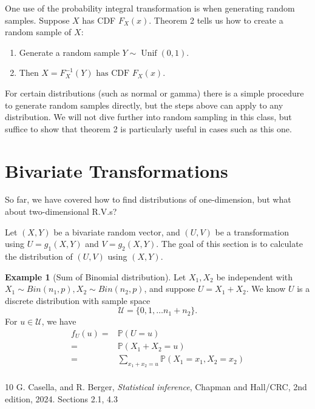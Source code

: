 \documentclass{article}
\theoremstyle{plain}
\theoremstyle{definition}
\newtheorem{exa}[thm]{Example}
\begin{document}
One use of the probability integral transformation is when generating random samples. Suppose $X$ has CDF $F_X(x)$. Theorem 2 tells us how to create a random sample of $X$:
\begin{enumerate}[label=(\arabic*)]
    \item Generate a random sample
$ Y \sim \operatorname{Unif}(0,1).$
\item Then $ X = F_X^{-1}(Y) \text{ has CDF } F_X(x).$
\end{enumerate}
For certain distributions (such as normal or gamma) there is a simple procedure to generate random samples directly, but the steps above can apply to any distribution. We will not dive further into random sampling in this class, but suffice to show that theorem 2 is particularly useful in cases such as this one. 

\section{Bivariate Transformations}

So far, we have covered how to find distributions of one-dimension, but what about two-dimensional R.V.s? 


Let $(X,Y)$ be a bivariate random vector, and $(U,V)$ be a transformation using $U = g_1(X,Y)$ and $V = g_2(X,Y).$ The goal of this section is to calculate the distribution of $(U,V)$ using $(X,Y)$.


\begin{exa}[Sum of Binomial distribution] \quad
    Let $X_1, X_2$ be independent with $X_1 \sim Bin(n_1,p), X_2 \sim Bin(n_2,p)$, and suppose $U = X_1+X_2$. We know $U$ is a discrete distribution with sample space $$\mathcal{U} = \{0, 1, \dots n_1+n_2\}.$$
    For $u \in \mathcal{U}$, we have
    \begin{align*}
        f_U(u) = & \mathbb{P}(U=u) \\
        = & \mathbb{P}(X_1+X_2=u) \\
        = & \sum_{x_1+x_2=u} \mathbb{P}(X_1=x_1,X_2=x_2) \\
    \end{align*}
\end{exa}


\begin{thebibliography}{10}
G. Casella,  and R. Berger,
{\it Statistical inference}, Chapman and Hall/CRC, 2nd edition, 2024.  Sections 2.1, 4.3
\end{thebibliography}
\end{document}
